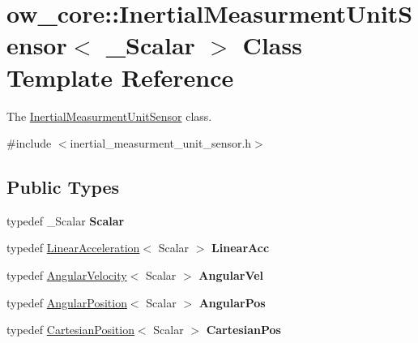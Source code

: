 \hypertarget{classow__core_1_1InertialMeasurmentUnitSensor}{}\section{ow\+\_\+core\+:\+:Inertial\+Measurment\+Unit\+Sensor$<$ \+\_\+\+Scalar $>$ Class Template Reference}
\label{classow__core_1_1InertialMeasurmentUnitSensor}


The \hyperlink{classow__core_1_1InertialMeasurmentUnitSensor}{Inertial\+Measurment\+Unit\+Sensor} class.  




{\ttfamily \#include $<$inertial\+\_\+measurment\+\_\+unit\+\_\+sensor.\+h$>$}

\subsection*{Public Types}
\begin{DoxyCompactItemize}
\item 
typedef \+\_\+\+Scalar {\bfseries Scalar}\hypertarget{classow__core_1_1InertialMeasurmentUnitSensor_ad3c4be2c1a01236fa66d7d20c0fe58d4}{}\label{classow__core_1_1InertialMeasurmentUnitSensor_ad3c4be2c1a01236fa66d7d20c0fe58d4}

\item 
typedef \hyperlink{classow__core_1_1LinearAcceleration}{Linear\+Acceleration}$<$ Scalar $>$ {\bfseries Linear\+Acc}\hypertarget{classow__core_1_1InertialMeasurmentUnitSensor_a897a19cc7bf88f12be7f9c595661dc3e}{}\label{classow__core_1_1InertialMeasurmentUnitSensor_a897a19cc7bf88f12be7f9c595661dc3e}

\item 
typedef \hyperlink{classow__core_1_1AngularVelocity}{Angular\+Velocity}$<$ Scalar $>$ {\bfseries Angular\+Vel}\hypertarget{classow__core_1_1InertialMeasurmentUnitSensor_a557bac8860c42a1d02750e7f0b104eb3}{}\label{classow__core_1_1InertialMeasurmentUnitSensor_a557bac8860c42a1d02750e7f0b104eb3}

\item 
typedef \hyperlink{classow__core_1_1AngularPosition}{Angular\+Position}$<$ Scalar $>$ {\bfseries Angular\+Pos}\hypertarget{classow__core_1_1InertialMeasurmentUnitSensor_a7cfbf4ae5dc4e1db2ea409b707990efe}{}\label{classow__core_1_1InertialMeasurmentUnitSensor_a7cfbf4ae5dc4e1db2ea409b707990efe}

\item 
typedef \hyperlink{classow__core_1_1CartesianPosition}{Cartesian\+Position}$<$ Scalar $>$ {\bfseries Cartesian\+Pos}\hypertarget{classow__core_1_1InertialMeasurmentUnitSensor_ae24f4b0cdc12f8b28d484800e44fa331}{}\label{classow__core_1_1InertialMeasurmentUnitSensor_ae24f4b0cdc12f8b28d484800e44fa331}

\end{DoxyCompactItemize}
